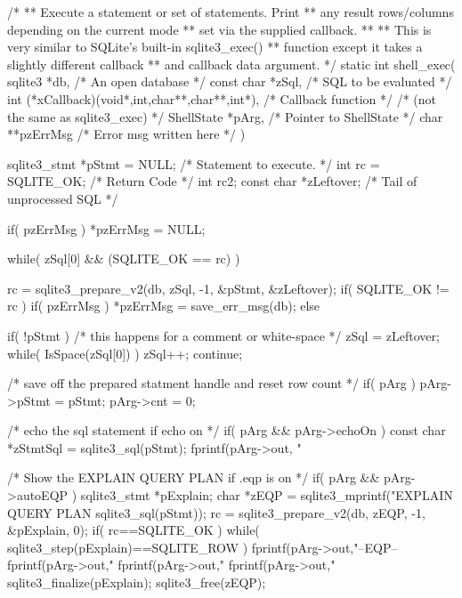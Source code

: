 \begin{Codex}[label=shell.c,numbers=left]
{/*
** Execute a statement or set of statements.  Print 
** any result rows/columns depending on the current mode 
** set via the supplied callback.
**
** This is very similar to SQLite's built-in sqlite3_exec() 
** function except it takes a slightly different callback 
** and callback data argument.
*/
static int shell_exec(
  sqlite3 *db,                              /* An open database */
  const char *zSql,                         /* SQL to be evaluated */
  int (*xCallback)(void*,int,char**,char**,int*),   /* Callback function */
                                            /* (not the same as sqlite3_exec) */
  ShellState *pArg,                         /* Pointer to ShellState */
  char **pzErrMsg                           /* Error msg written here */
){
  sqlite3_stmt *pStmt = NULL;     /* Statement to execute. */
  int rc = SQLITE_OK;             /* Return Code */
  int rc2;
  const char *zLeftover;          /* Tail of unprocessed SQL */

  if( pzErrMsg ){
    *pzErrMsg = NULL;
  }

  while( zSql[0] && (SQLITE_OK == rc) ){
    rc = sqlite3_prepare_v2(db, zSql, -1, &pStmt, &zLeftover);
    if( SQLITE_OK != rc ){
      if( pzErrMsg ){
        *pzErrMsg = save_err_msg(db);
      }
    }else{
      if( !pStmt ){
        /* this happens for a comment or white-space */
        zSql = zLeftover;
        while( IsSpace(zSql[0]) ) zSql++;
        continue;
      }

      /* save off the prepared statment handle and reset row count */
      if( pArg ){
        pArg->pStmt = pStmt;
        pArg->cnt = 0;
      }

      /* echo the sql statement if echo on */
      if( pArg && pArg->echoOn ){
        const char *zStmtSql = sqlite3_sql(pStmt);
        fprintf(pArg->out, "%
      }

      /* Show the EXPLAIN QUERY PLAN if .eqp is on */
      if( pArg && pArg->autoEQP ){
        sqlite3_stmt *pExplain;
        char *zEQP = sqlite3_mprintf("EXPLAIN QUERY PLAN %
                                     sqlite3_sql(pStmt));
        rc = sqlite3_prepare_v2(db, zEQP, -1, &pExplain, 0);
        if( rc==SQLITE_OK ){
          while( sqlite3_step(pExplain)==SQLITE_ROW ){
            fprintf(pArg->out,"--EQP-- %
            fprintf(pArg->out,"%
            fprintf(pArg->out,"%
            fprintf(pArg->out,"%
          }
        }
        sqlite3_finalize(pExplain);
        sqlite3_free(zEQP);
      }

}}}}
\end{Codex}
